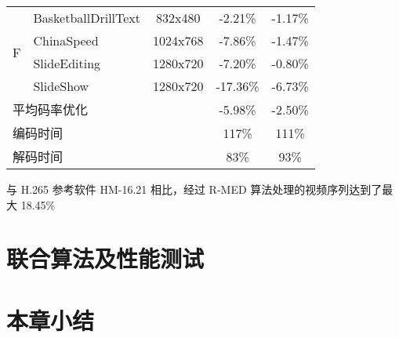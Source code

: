 \begin{table}[!p]
\begin{tabular}{@{}clccc@{}}
        \multirow{4}{*}{F}               & BasketballDrillText                       & 832x480                 & -2.21\%                            & -1.17\%                    \\
                                         & ChinaSpeed                                & 1024x768                & -7.86\%                            & -1.47\%                    \\
                                         & SlideEditing                              & 1280x720                & -7.20\%                            & -0.80\%                    \\
                                         & SlideShow                                 & 1280x720                & -17.36\%                           & -6.73\%                    \\ \midrule
        \multicolumn{2}{l}{平均码率优化} &                                           & -5.98\%                 & -2.50\%                                                         \\ \midrule
        \multicolumn{2}{l}{编码时间}     &                                           & 117\%                   & 111\%                                                           \\ \midrule
        \multicolumn{2}{l}{解码时间}     &                                           & 83\%                    & 93\%                                                            \\ \bottomrule
    \end{tabular}
\end{table}

与 H.265 参考软件 HM-16.21 相比，经过 R-MED 算法处理的视频序列达到了最大 18.45\%

\section{联合算法及性能测试}

\section{本章小结}
